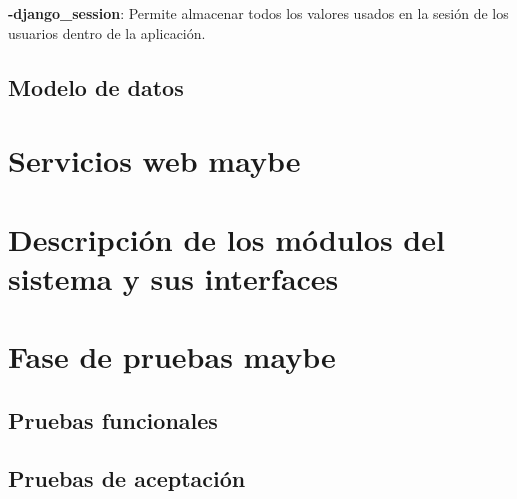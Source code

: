 \textbf{-django\_session}: Permite almacenar todos los valores usados en la sesión de los usuarios dentro de la aplicación.


\setlength{\parskip}{0mm}





\subsection{Modelo de datos}
\setlength{\parskip}{5mm}
\setlength{\parskip}{0mm}


\section{Servicios web maybe} 
\setlength{\parskip}{5mm}
\setlength{\parskip}{0mm}

\section{Descripción de los módulos del sistema y sus interfaces } 
\setlength{\parskip}{5mm}
\setlength{\parskip}{0mm}


\section{Fase de pruebas maybe } 
\setlength{\parskip}{5mm}
\setlength{\parskip}{0mm}

\subsection{Pruebas funcionales}
\setlength{\parskip}{5mm}
\setlength{\parskip}{0mm}

\subsection{Pruebas de aceptación}
\setlength{\parskip}{5mm}
\setlength{\parskip}{0mm}
